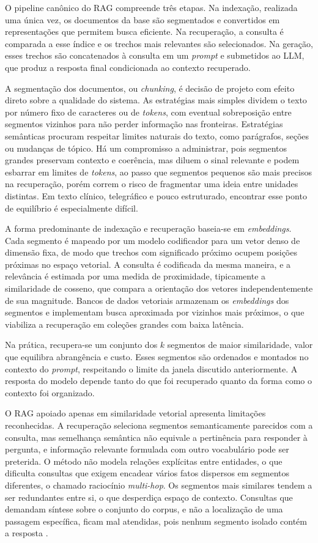 O pipeline canônico do RAG compreende três etapas. Na indexação, realizada uma única vez, os documentos da base são segmentados e convertidos em representações que permitem busca eficiente. Na recuperação, a consulta é comparada a esse índice e os trechos mais relevantes são selecionados. Na geração, esses trechos são concatenados à consulta em um \textit{prompt} e submetidos ao LLM, que produz a resposta final condicionada ao contexto recuperado.

A segmentação dos documentos, ou \textit{chunking}, é decisão de projeto com efeito direto sobre a qualidade do sistema. As estratégias mais simples dividem o texto por número fixo de caracteres ou de \textit{tokens}, com eventual sobreposição entre segmentos vizinhos para não perder informação nas fronteiras. Estratégias semânticas procuram respeitar limites naturais do texto, como parágrafos, seções ou mudanças de tópico. Há um compromisso a administrar, pois segmentos grandes preservam contexto e coerência, mas diluem o sinal relevante e podem esbarrar em limites de \textit{tokens}, ao passo que segmentos pequenos são mais precisos na recuperação, porém correm o risco de fragmentar uma ideia entre unidades distintas. Em texto clínico, telegráfico e pouco estruturado, encontrar esse ponto de equilíbrio é especialmente difícil.

A forma predominante de indexação e recuperação baseia-se em \textit{embeddings}. Cada segmento é mapeado por um modelo codificador para um vetor denso de dimensão fixa, de modo que trechos com significado próximo ocupem posições próximas no espaço vetorial. A consulta é codificada da mesma maneira, e a relevância é estimada por uma medida de proximidade, tipicamente a similaridade de cosseno, que compara a orientação dos vetores independentemente de sua magnitude. Bancos de dados vetoriais armazenam os \textit{embeddings} dos segmentos e implementam busca aproximada por vizinhos mais próximos, o que viabiliza a recuperação em coleções grandes com baixa latência.

Na prática, recupera-se um conjunto dos $k$ segmentos de maior similaridade, valor que equilibra abrangência e custo. Esses segmentos são ordenados e montados no contexto do \textit{prompt}, respeitando o limite da janela discutido anteriormente. A resposta do modelo depende tanto do que foi recuperado quanto da forma como o contexto foi organizado.

O RAG apoiado apenas em similaridade vetorial apresenta limitações reconhecidas. A recuperação seleciona segmentos semanticamente parecidos com a consulta, mas semelhança semântica não equivale a pertinência para responder à pergunta, e informação relevante formulada com outro vocabulário pode ser preterida. O método não modela relações explícitas entre entidades, o que dificulta consultas que exigem encadear vários fatos dispersos em segmentos diferentes, o chamado raciocínio \textit{multi-hop}. Os segmentos mais similares tendem a ser redundantes entre si, o que desperdiça espaço de contexto. Consultas que demandam síntese sobre o conjunto do corpus, e não a localização de uma passagem específica, ficam mal atendidas, pois nenhum segmento isolado contém a resposta \citep{gao2024,edge2024}.


